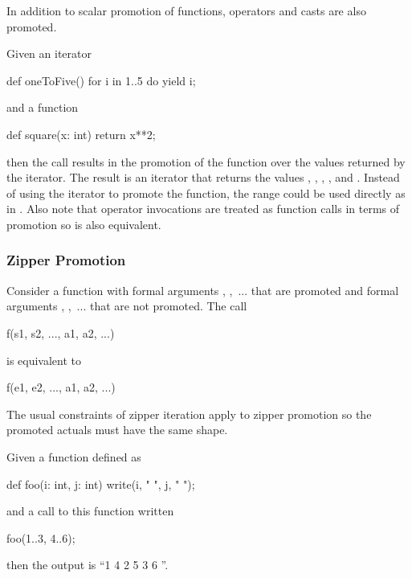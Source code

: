 In addition to scalar promotion of functions, operators and casts are
also promoted.

\begin{example}
Given an iterator
\begin{chapel}
def oneToFive() {
  for i in 1..5 do
    yield i;
}
\end{chapel}
and a function
\begin{chapel}
def square(x: int) return x**2;
\end{chapel}
then the call  results in the promotion of
the  function over the values returned by
the  iterator.  The result is an iterator that returns
the values , , , , and .
Instead of using the  iterator to promote
the  function, the range  could be used
directly as in .  Also note that operator
invocations are treated as function calls in terms of promotion
so  is also equivalent.
\end{example}

\subsubsection{Zipper Promotion}
\label{Zipper_Promotion}

Consider a function  with formal
arguments , ,~... that are promoted and formal
arguments , ,~... that are not promoted.  The call
\begin{chapel}
f(s1, s2, ..., a1, a2, ...)
\end{chapel}
is equivalent to
\begin{chapel}
[(e1, e2, ...) in (s1, s2, ...)] f(e1, e2, ..., a1, a2, ...)
\end{chapel}
The usual constraints of zipper iteration apply to zipper promotion so
the promoted actuals must have the same shape.

\begin{example}
Given a function defined as
\begin{chapel}
def foo(i: int, j: int) {
  write(i, " ", j, " ");
}
\end{chapel}
and a call to this function written
\begin{chapel}
foo(1..3, 4..6);
\end{chapel}
then the output is ``1 4 2 5 3 6 ''.
\end{example}


